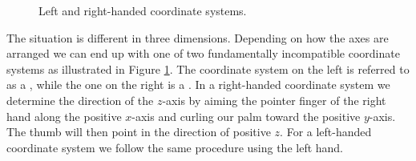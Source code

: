 \begin{figure}
\begin{center}

\hspace{1in}
\end{center}
\caption{Left and right-handed coordinate systems.}
\label{fig:left_right_coordinates}
\end{figure}


The situation is different in three dimensions.  Depending on how the
axes are arranged we can end up with one of two fundamentally
incompatible coordinate systems as illustrated in Figure
\ref{fig:left_right_coordinates}.  The coordinate system on the left
is referred to as a , while the one on
the right is a .  In a right-handed
coordinate system we determine the direction of the $z$-axis by aiming
the pointer finger of the right hand along the positive $x$-axis and
curling our palm toward the positive $y$-axis.  The thumb will then
point in the direction of positive $z$.  For a left-handed coordinate
system we follow the same procedure using the left hand.


